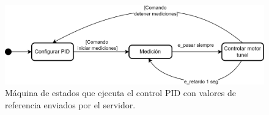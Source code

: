 \begin{figure}[H]
    \centering
    \includegraphics[width=0.95\linewidth]{Figuras/datalogger/Firmware/sc_controlTunnel.png}
    \caption{Máquina de estados que ejecuta el control PID con valores de referencia enviados por el servidor.}
    \label{fig:sc_controlTunnel}
\end{figure}
